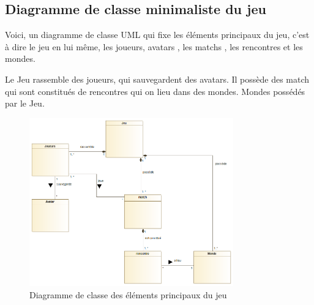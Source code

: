 
\subsection{Diagramme de classe minimaliste du jeu}
\label{sec:question-1}

Voici, un diagramme de classe UML qui fixe les éléments principaux du jeu, c'est à dire le jeu en lui même, les joueurs, avatars , les matchs , les rencontres et les mondes.

Le Jeu rassemble des joueurs, qui sauvegardent des avatars. Il possède des match qui sont constitués de rencontres qui on lieu dans des mondes. Mondes possédés par le Jeu.

\begin{figure}[h!]
	\centering
	\includegraphics[width=250pt]{assets/diagrammeclassebase}
	\caption{Diagramme de classe des éléments principaux du jeu}
	\label{fig:diagrammeclassebase}
\end{figure}

\newpage